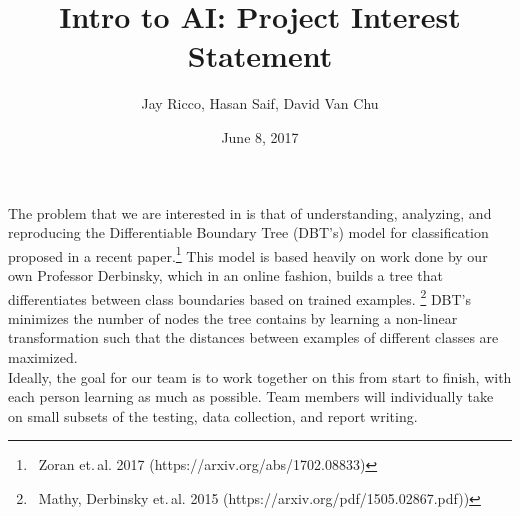 \documentclass[12pt,letterpaper]{article}
\author{Jay Ricco, Hasan Saif, David Van Chu}
\title{Intro to AI: Project Interest Statement}
\date{June 8, 2017}
\begin{document}
	\maketitle

	The problem that we are interested in is that of understanding, analyzing, and reproducing the Differentiable Boundary Tree (DBT's) model for classification proposed in a recent paper.\footnote{\ Zoran et.\,al. 2017 (https://arxiv.org/abs/1702.08833)} This model is based heavily on work done by our own Professor Derbinsky, which in an online fashion, builds a tree that differentiates between class boundaries based on trained examples. \footnote{\ Mathy, Derbinsky et.\,al. 2015 (https://arxiv.org/pdf/1505.02867.pdf))} DBT's minimizes the number of nodes the tree contains by learning a non-linear transformation such that the distances between examples of different classes are maximized. \\
	
	Ideally, the goal for our team is to work together on this from start to finish, with each person learning as much as possible. Team members will individually take on small subsets of the testing, data collection, and report writing. 
\end{document}
